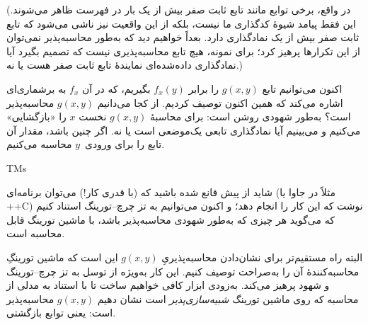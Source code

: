\documentclass[../../../include/open-logic-section]{subfiles}
\begin{document}
(در واقع، برخی توابع مانند تابع ثابت صفر بیش از یک بار در فهرست ظاهر
می‌شوند. این فقط پیامد شیوهٔ کدگذاری ما نیست، بلکه از این واقعیت نیز
ناشی می‌شود که تابع ثابت صفر بیش از یک نمادگذاری دارد. بعداً خواهیم
دید که به‌طور محاسبه‌پذیر نمی‌توان از این تکرارها پرهیز کرد؛ برای
نمونه، هیچ تابع محاسبه‌پذیری نیست که تصمیم بگیرد آیا نمادگذاری
داده‌شده‌ای نمایندهٔ تابع ثابت صفر هست یا نه.)

اکنون می‌توانیم تابع $g(x,y)$ را برابر $f_x(y)$ بگیریم، که در آن
$f_x$ به برشماری‌ای اشاره می‌کند که همین اکنون توصیف کردیم. از کجا
می‌دانیم $g(x,y)$ محاسبه‌پذیر است؟ به‌طور شهودی روشن است: برای
محاسبهٔ $g(x,y)$ نخست $x$ را «بازگشایی» می‌کنیم و می‌بینیم آیا
نمادگذاری تابعی یک‌موضعی است یا نه. اگر چنین باشد، مقدار آن تابع را
برای ورودی~$y$ محاسبه می‌کنیم.

\begin{tagblock}{TMs}
\begin{digress}
شاید از پیش قانع شده باشید که (با قدری کار!) می‌توان برنامه‌ای
(مثلاً در جاوا یا ++C) نوشت که این کار را انجام دهد؛ و اکنون می‌توانیم
به تز چرچ--تورینگ استناد کنیم که می‌گوید هر چیزی که به‌طور شهودی
محاسبه‌پذیر باشد، با ماشین تورینگ قابل محاسبه است.

البته راه مستقیم‌تر برای نشان‌دادن محاسبه‌پذیریِ $g(x,y)$ این است که
ماشین تورینگِ محاسبه‌کنندهٔ آن را به‌صراحت توصیف کنیم. این کار به‌ویژه
از توسل به تز چرچ--تورینگ و شهود پرهیز می‌کند. به‌زودی ابزار کافی
خواهیم ساخت تا با استناد به مدلی از محاسبه که روی ماشین تورینگ
\emph{شبیه‌سازی‌پذیر} است نشان دهیم $g(x,y)$ محاسبه‌پذیر است: یعنی
توابع بازگشتی.
\end{digress}
\end{tagblock}
\end{document}
